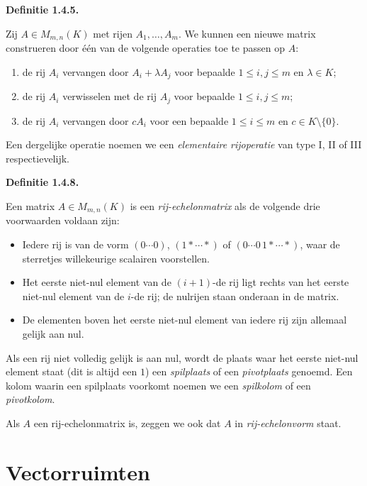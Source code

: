 \documentclass[10pt,a4paper]{article}
\newenvironment{res}[1]{%
  \par\noindent\textbf{Definitie #1.}~\ignorespaces
}{%
  \par\vspace{2pt}\normalfont
}
\begin{document}
\begin{res}{1.4.5}
Zij $A\in M_{m,n}(K)$ met rijen $A_1,\dots,A_m$. We kunnen een nieuwe matrix construeren door \'e\'en van de volgende operaties toe te passen op $A$:
\begin{enumerate}[label=(\arabic*),leftmargin=1.8em,itemsep=1pt,topsep=1pt]
\item de rij $A_i$ vervangen door $A_i+\lambda A_j$ voor bepaalde $1\le i,j\le m$ en $\lambda\in K$;
\item de rij $A_i$ verwisselen met de rij $A_j$ voor bepaalde $1\le i,j\le m$;
\item de rij $A_i$ vervangen door $cA_i$ voor een bepaalde $1\le i\le m$ en $c\in K\setminus\{0\}$.
\end{enumerate}
Een dergelijke operatie noemen we een \textit{elementaire rijoperatie} van type I, II of III respectievelijk.
\end{res}

\begin{res}{1.4.8}
Een matrix $A\in M_{m,n}(K)$ is een \textit{rij-echelonmatrix} als de volgende drie voorwaarden voldaan zijn:
\begin{itemize}[leftmargin=1.8em,itemsep=1pt,topsep=1pt]
\item Iedere rij is van de vorm $(0\cdots0)$, $(1*\cdots*)$ of $(0\cdots0\,1*\cdots*)$, waar de sterretjes willekeurige scalairen voorstellen.
\item Het eerste niet-nul element van de $(i+1)$-de rij ligt rechts van het eerste niet-nul element van de $i$-de rij; de nulrijen staan onderaan in de matrix.
\item De elementen boven het eerste niet-nul element van iedere rij zijn allemaal gelijk aan nul.
\end{itemize}
Als een rij niet volledig gelijk is aan nul, wordt de plaats waar het eerste niet-nul element staat (dit is altijd een $1$) een \textit{spilplaats} of een \textit{pivotplaats} genoemd. Een kolom waarin een spilplaats voorkomt noemen we een \textit{spilkolom} of een \textit{pivotkolom}.

Als $A$ een rij-echelonmatrix is, zeggen we ook dat $A$ in \textit{rij-echelonvorm} staat.
\end{res}

\section{Vectorruimten}
\end{document}
